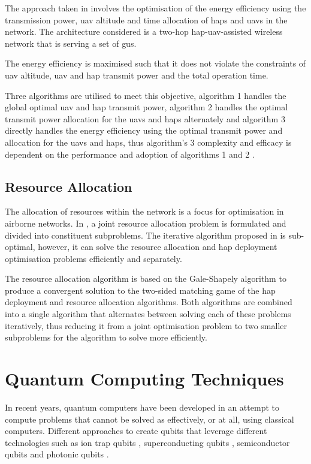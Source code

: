 The approach taken in \cite{zhang_energy-efficient_2024} involves the optimisation of the energy efficiency using the transmission power, \acrshort{uav} altitude and time allocation of \acrshort{hap}s and \acrshort{uav}s in the network. The architecture considered is a two-hop \acrshort{hap}-\acrshort{uav}-assisted wireless network that is serving a set of \acrshort{gu}s. 

The energy efficiency is maximised such that it does not violate the constraints of \acrshort{uav} altitude, \acrshort{uav} and \acrshort{hap} transmit power and the total operation time. 

Three algorithms are utilised to meet this objective, algorithm 1 handles the global optimal \acrshort{uav} and \acrshort{hap} transmit power, algorithm 2 handles the optimal transmit power allocation for the \acrshort{uav}s and \acrshort{hap}s alternately and algorithm 3 directly handles the energy efficiency using the optimal transmit power and allocation for the \acrshort{uav}s and \acrshort{hap}s, thus algorithm's 3 complexity and efficacy is dependent on the performance and adoption of algorithms 1 and 2 \cite{zhang_energy-efficient_2024}.

\subsection{Resource Allocation}
The allocation of resources within the network is a focus for optimisation in airborne networks. In \cite{ji_joint_2023}, a joint resource allocation problem is formulated and divided into constituent subproblems. The iterative algorithm proposed in \cite{ji_joint_2023} is sub-optimal, however, it can solve the resource allocation and \acrshort{hap} deployment optimisation problems efficiently and separately.

The resource allocation algorithm is based on the Gale-Shapely algorithm to produce a convergent solution to the two-sided matching game of the \acrshort{hap} deployment and resource allocation algorithms. 
Both algorithms are combined into a single algorithm that alternates between solving each of these problems iteratively, thus reducing it from a joint optimisation problem to two smaller subproblems for the algorithm to solve more efficiently. 

\section{Quantum Computing Techniques}
In recent years, quantum computers have been developed in an attempt to compute problems that cannot be solved as effectively, or at all, using classical computers. Different approaches to create qubits that leverage different technologies such as ion trap qubits \cite{Bruzewicz_2019}, superconducting qubits \cite{Krantz_2019}, semiconductor qubits \cite{chatterjee_semiconductor_2021} and photonic qubits \cite{Kok_2007}. 


